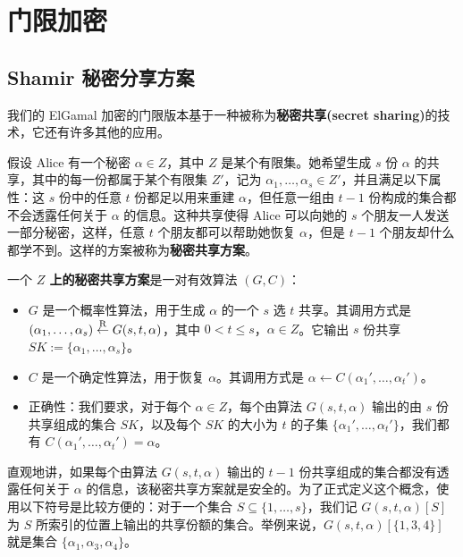 \section{门限加密}\label{sec:11-6}

\begin{definition}\label{def:11-6}
	
\end{definition}

\subsection{Shamir 秘密分享方案}\label{subsec:11-6-1}

我们的 ElGamal 加密的门限版本基于一种被称为\textbf{秘密共享(secret sharing)}的技术，它还有许多其他的应用。

假设 Alice 有一个秘密 $\alpha\in Z$，其中 $Z$ 是某个有限集。她希望生成 $s$ 份 $\alpha$ 的共享，其中的每一份都属于某个有限集 $Z'$，记为 $\alpha_1,\dots,\alpha_s\in Z'$，并且满足以下属性：这 $s$ 份中的任意 $t$ 份都足以用来重建 $\alpha$，但任意一组由 $t-1$ 份构成的集合都不会透露任何关于 $\alpha$ 的信息。这种共享使得 Alice 可以向她的 $s$ 个朋友一人发送一部分秘密，这样，任意 $t$ 个朋友都可以帮助她恢复 $\alpha$，但是 $t-1$ 个朋友却什么都学不到。这样的方案被称为\textbf{秘密共享方案}。

\begin{definition}\label{def:11-7}
一个 \textbf{$Z$ 上的秘密共享方案}是一对有效算法 $(G,C)$：
\begin{itemize}
	\item $G$ 是一个概率性算法，用于生成 $\alpha$ 的一个 $s$ 选 $t$ 共享。其调用方式是 $(\alpha_1,\dots,\alpha_s)\overset{\rm R}\leftarrow G(s,t,\alpha)$，其中 $0<t\leq s$，$\alpha\in Z$。它输出 $s$ 份共享 $\mathit{SK}:=\{\alpha_1,\dots,\alpha_s\}$。
	\item $C$ 是一个确定性算法，用于恢复 $\alpha$。其调用方式是 $\alpha\leftarrow C(\alpha_1',\dots,\alpha_t')$。
	\item 正确性：我们要求，对于每个 $\alpha\in Z$，每个由算法 $G(s,t,\alpha)$ 输出的由 $s$ 份共享组成的集合 $SK$，以及每个 $\mathit{SK}$ 的大小为 $t$ 的子集 $\{\alpha_1',\dots,\alpha_t'\}$，我们都有 $C(\alpha_1',\dots,\alpha_t')=\alpha$。
\end{itemize}
\end{definition}

直观地讲，如果每个由算法 $G(s,t,\alpha)$ 输出的 $t-1$ 份共享组成的集合都没有透露任何关于 $\alpha$ 的信息，该秘密共享方案就是安全的。为了正式定义这个概念，使用以下符号是比较方便的：对于一个集合 $S\subseteq\{1,\dots,s\}$，我们记 $G(s,t,\alpha)[S]$ 为 $S$ 所索引的位置上输出的共享份额的集合。举例来说，$G(s,t,\alpha)[\{1,3,4\}]$ 就是集合 $\{\alpha_1,\alpha_3,\alpha_4\}$。


